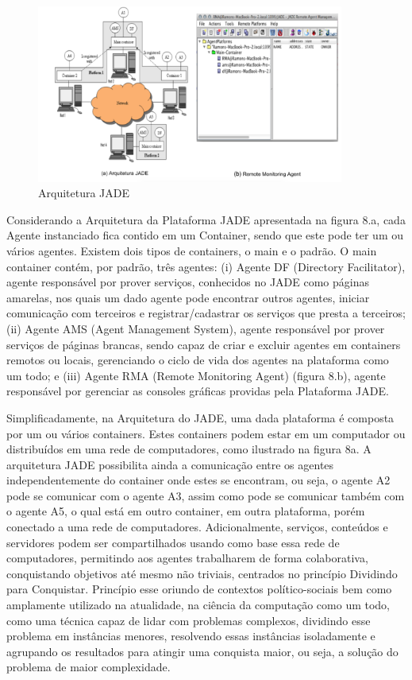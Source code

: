 \begin{figure}[h]
\centering
\label{f10}
\includegraphics[width=0.9\textwidth]{figuras/f08}
\caption{Arquitetura JADE}

\end{figure}


Considerando a Arquitetura da Plataforma JADE apresentada na figura 8.a, cada Agente instanciado fica contido em um Container, sendo que este pode ter um ou vários agentes. Existem dois tipos de containers, o main e o padrão. O main container contém, por padrão, três agentes: (i) Agente DF (Directory Facilitator), agente responsável por prover serviços, conhecidos no JADE como páginas amarelas, nos quais um dado agente pode encontrar outros agentes, iniciar comunicação com terceiros e registrar/cadastrar os serviços que presta a terceiros; (ii) Agente AMS (Agent Management System), agente responsável por prover serviços de páginas brancas, sendo capaz de criar e excluir agentes em containers remotos ou locais, gerenciando o ciclo de vida dos agentes na plataforma como um todo; e (iii) Agente RMA (Remote Monitoring Agent) (figura 8.b), agente responsável por gerenciar as consoles gráficas providas pela Plataforma JADE.

Simplificadamente, na Arquitetura do JADE, uma dada plataforma é composta por um ou vários containers. Estes containers podem estar em um computador ou distribuídos em uma rede de computadores, como ilustrado na figura 8a. A arquitetura JADE possibilita ainda a comunicação entre os agentes independentemente do container onde estes se encontram, ou seja, o agente A2 pode se comunicar com o agente A3, assim como pode se comunicar também com o agente A5, o qual está em outro container, em outra plataforma, porém conectado a uma rede de computadores. Adicionalmente, serviços, conteúdos e servidores podem ser compartilhados usando como base essa rede de computadores, permitindo aos agentes trabalharem de forma colaborativa, conquistando objetivos até mesmo não triviais, centrados no princípio Dividindo para Conquistar. Princípio esse oriundo de contextos político-sociais bem como amplamente utilizado na atualidade, na ciência da computação como um todo, como uma técnica capaz de lidar com problemas complexos, dividindo esse problema em instâncias menores, resolvendo essas instâncias isoladamente e agrupando os resultados para atingir uma conquista maior, ou seja, a solução do problema de maior complexidade.


